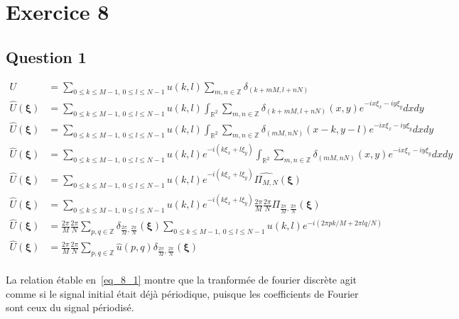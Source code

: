 \documentclass[12pt,a4paper,onecolumn]{article}
\begin{document}
\clearpage

\section{Exercice 8}

\subsection{Question 1}

\begin{equation}
	\begin{split}
		U &= \sum_{0\le k \le M-1,~0 \le l \le N-1}u(k,l)\sum_{m,n\in \mathbb{Z}}\delta_{(k + mM, l + nN)}\\
		\widehat{U}(\bm{\xi}) &= \sum_{0\le k \le M-1,~0 \le l \le N-1}u(k,l) \int_{\mathbb{R}^2}\sum_{m,n\in \mathbb{Z}}\delta_{(k + mM, l + nN)}(x, y)e^{-ix\xi_x - iy\xi_y}dxdy \\
		\widehat{U}(\bm{\xi}) &= \sum_{0\le k \le M-1,~0 \le l \le N-1}u(k,l) \int_{\mathbb{R}^2}\sum_{m,n\in \mathbb{Z}}\delta_{(mM, nN)}(x - k, y - l)e^{-ix\xi_x - iy\xi_y}dxdy \\
		\widehat{U}(\bm{\xi}) &= \sum_{0\le k \le M-1,~0 \le l \le N-1}u(k,l) e^{-i(k\xi_x + l\xi_y)}\int_{\mathbb{R}^2}\sum_{m,n\in \mathbb{Z}}\delta_{(mM, nN)}(x, y)e^{-ix\xi_x - iy\xi_y}dxdy \\
		\widehat{U}(\bm{\xi}) &= \sum_{0\le k \le M-1,~0 \le l \le N-1}u(k,l) e^{-i(k\xi_x + l\xi_y)}\widehat{\Pi_{M, N}}(\bm{\xi}) \\
		\widehat{U}(\bm{\xi}) &= \sum_{0\le k \le M-1,~0 \le l \le N-1}u(k,l) e^{-i(k\xi_x + l\xi_y)}\frac{2\pi}{M}\frac{2\pi}{N}\Pi_{\frac{2\pi}{M}, \frac{2\pi}{N}}(\bm{\xi}) \\
		\widehat{U}(\bm{\xi}) &= \frac{2\pi}{M}\frac{2\pi}{N}\sum_{p,q\in \mathbb{Z}}\delta_{\frac{2\pi}{M}, \frac{2\pi}{N}}(\bm{\xi})\sum_{0\le k \le M-1,~0 \le l \le N-1}u(k,l) e^{-i(2\pi pk/M + 2\pi lq/N)}\\
		\widehat{U}(\bm{\xi}) &= \frac{2\pi}{M}\frac{2\pi}{N}\sum_{p,q\in \mathbb{Z}}\widehat{u}(p, q) \delta_{\frac{2\pi}{M}, \frac{2\pi}{N}}(\bm{\xi})\\
	\end{split}
	\label{eq_8_1}
\end{equation}

La relation étable en~\eqref{eq_8_1} montre que la tranformée de fourier discrète agit comme si le signal initial était déjà périodique, puisque les coefficients de Fourier sont ceux du signal périodisé.
\end{document}
